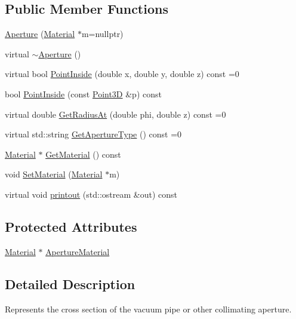 \subsection*{Public Member Functions}
\begin{DoxyCompactItemize}
\item 
\hyperlink{classAperture_ad20a215bea35fe695d98c1d4e000112f}{Aperture} (\hyperlink{classMaterial}{Material} $\ast$m=nullptr)
\item 
virtual \hyperlink{classAperture_ad2ec00bf784a25710ce4049f339513d6}{$\sim$\+Aperture} ()
\item 
virtual bool \hyperlink{classAperture_a77854d058bf8a00cfeb7a6d766dc0028}{Point\+Inside} (double x, double y, double z) const =0
\item 
bool \hyperlink{classAperture_a3fe1acdd1ca1792a7df9305b2ff6e454}{Point\+Inside} (const \hyperlink{classTVec3D}{Point3D} \&p) const
\item 
virtual double \hyperlink{classAperture_ad0ea7907d393ec1e6a8303343fe9dd29}{Get\+Radius\+At} (double phi, double z) const =0
\item 
virtual std\+::string \hyperlink{classAperture_ad7af612271a0586feea83c38549dfb75}{Get\+Aperture\+Type} () const =0
\item 
\hyperlink{classMaterial}{Material} $\ast$ \hyperlink{classAperture_ae75acab11fe8687836cd71afe80e9dd2}{Get\+Material} () const
\item 
void \hyperlink{classAperture_aa35484166441c2be0e2e159c6d6f4a11}{Set\+Material} (\hyperlink{classMaterial}{Material} $\ast$m)
\item 
virtual void \hyperlink{classAperture_aff2f276b93bb2cb94e559e1c4901e38e}{printout} (std\+::ostream \&out) const
\end{DoxyCompactItemize}
\subsection*{Protected Attributes}
\begin{DoxyCompactItemize}
\item 
\hyperlink{classMaterial}{Material} $\ast$ \hyperlink{classAperture_ae92ba16dcfebf1949db67b8fc0ae3c7b}{Aperture\+Material}
\end{DoxyCompactItemize}


\subsection{Detailed Description}
Represents the cross section of the vacuum pipe or other collimating aperture. 

